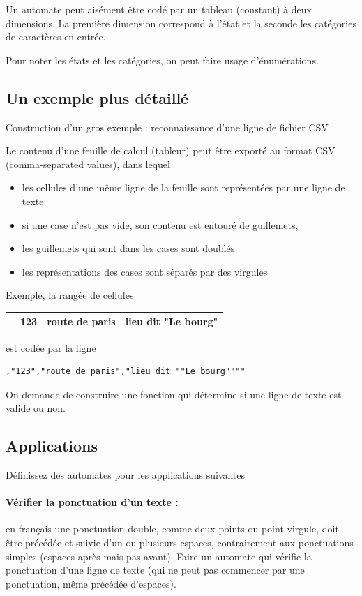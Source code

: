 \documentclass[10pt,twoside]{article}
\begin{document}
Un automate peut aisément être codé par un tableau (constant) à deux dimensions. 
La première dimension correspond à l'état 
et la seconde les catégories de caractères en entrée.

Pour noter les états et les catégories, on peut faire usage d'énumérations.





\subsection{Un exemple plus détaillé}

Construction d'un gros exemple : reconnaissance d'une ligne de fichier CSV

Le contenu d'une feuille de calcul (tableur) peut être exporté au format CSV
(comma-separated values), dans lequel
\begin{itemize}
\item les cellules d'une même ligne de la feuille sont représentées par une ligne de texte
\item si une case n'est pas vide, son contenu est entouré de guillemets,
\item les guillemets qui sont dans les cases sont doublés
\item les représentations des cases sont séparés par des virgules
\end{itemize}


Exemple, la rangée de cellules
\begin{center}
\begin{tabular}{|c|c|c|c|}
\hline
& 123 & route de paris & lieu dit "Le bourg" \\
\hline
\end{tabular}
\end{center}


est codée par la ligne
\begin{verbatim}
,"123","route de paris","lieu dit ""Le bourg""""
\end{verbatim}
On demande de construire une fonction qui détermine si une ligne de texte est valide ou non.


\subsection{Applications}

Définissez des automates pour les applications suivantes

\paragraph{Vérifier la ponctuation d'un texte  : }  en français une ponctuation
double, comme deux-points ou point-virgule, doit être précédée et
suivie d'un ou plusieurs espaces, contrairement aux ponctuations
simples (espaces après mais pas avant).  Faire un automate qui vérifie
la ponctuation d'une ligne de texte (qui ne peut pas commencer par une
ponctuation, même précédée d'espaces).
\end{document}
